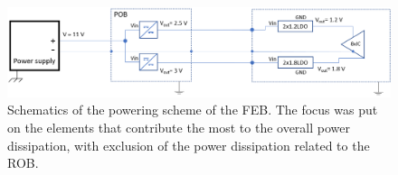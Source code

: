  \begin{figure}[h!]
\centering
\includegraphics[width=1\columnwidth]{Chapter6/DCS/images/powering_diss_feb.png}
\caption{Schematics of the powering scheme of the \gls{FEB}. The focus was put on the elements that contribute the most to the overall power dissipation, with exclusion of the power dissipation related to the \gls{ROB}.}
\label{fig_power_scheme}
\end{figure}
\begin{table}[!h]
\centering
\caption{Power dissipation of the powering system in function of the CSA registers values. Once the ASICs are configured, the digital line current remains constant. }
\label{tab:distribution}
\end{table}

